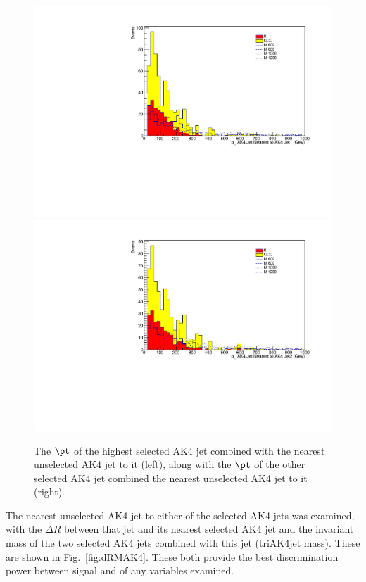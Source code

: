 \begin{figure}[thb!]
\begin{center}
\includegraphics[scale=0.34]{Figures/extraplSRpTnAKAK1.pdf}
\includegraphics[scale=0.34]{Figures/extraplSRpTnAKAK2.pdf}
\end{center}
\caption{The $\pt$ of the highest selected AK4 jet combined with the nearest unselected AK4 jet to it (left), along with the $\pt$ of the other selected AK4 jet combined the nearest unselected AK4 jet to it (right).}
\label{fig:ptnAK4}
\end{figure} 

The nearest unselected AK4 jet to either of the selected AK4 jets was examined, with the $\Delta R$ between that jet and its nearest selected AK4 jet and the invariant mass of the two selected AK4 jets combined with this jet (triAK4jet mass). These are shown in Fig.~\ref{fig:dRMAK4}. These both provide the best discrimination power between signal and \ttbar of any variables examined.

